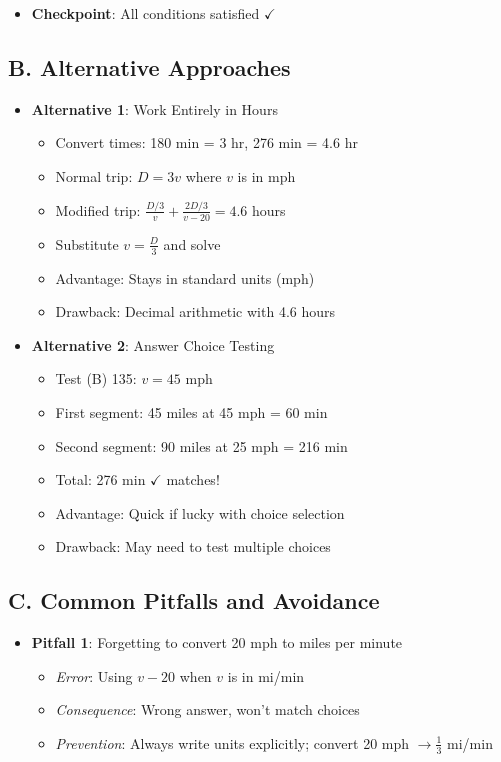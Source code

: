 \documentclass[11pt]{article}
\begin{document}
\begin{roadmapbox}
\begin{itemize}[leftmargin=*]
    \item \textbf{Checkpoint}: All conditions satisfied $\checkmark$
\end{itemize}

\subsection*{B. Alternative Approaches}
\begin{itemize}[leftmargin=*]
    \item \textbf{Alternative 1}: Work Entirely in Hours
    \begin{itemize}[leftmargin=*]
        \item Convert times: 180 min = 3 hr, 276 min = 4.6 hr
        \item Normal trip: $D = 3v$ where $v$ is in mph
        \item Modified trip: $\frac{D/3}{v} + \frac{2D/3}{v-20} = 4.6$ hours
        \item Substitute $v = \frac{D}{3}$ and solve
        \item Advantage: Stays in standard units (mph)
        \item Drawback: Decimal arithmetic with 4.6 hours
    \end{itemize}
    
    \item \textbf{Alternative 2}: Answer Choice Testing
    \begin{itemize}[leftmargin=*]
        \item Test (B) 135: $v = 45$ mph
        \item First segment: 45 miles at 45 mph = 60 min
        \item Second segment: 90 miles at 25 mph = 216 min
        \item Total: 276 min $\checkmark$ matches!
        \item Advantage: Quick if lucky with choice selection
        \item Drawback: May need to test multiple choices
    \end{itemize}
\end{itemize}

\subsection*{C. Common Pitfalls and Avoidance}
\begin{itemize}[leftmargin=*]
    \item \textbf{Pitfall 1}: Forgetting to convert 20 mph to miles per minute
    \begin{itemize}[leftmargin=*]
        \item \textit{Error}: Using $v - 20$ when $v$ is in mi/min
        \item \textit{Consequence}: Wrong answer, won't match choices
        \item \textit{Prevention}: Always write units explicitly; convert 20 mph $\rightarrow \frac{1}{3}$ mi/min
    \end{itemize}
    

\end{itemize}
\end{roadmapbox}
\end{document}
